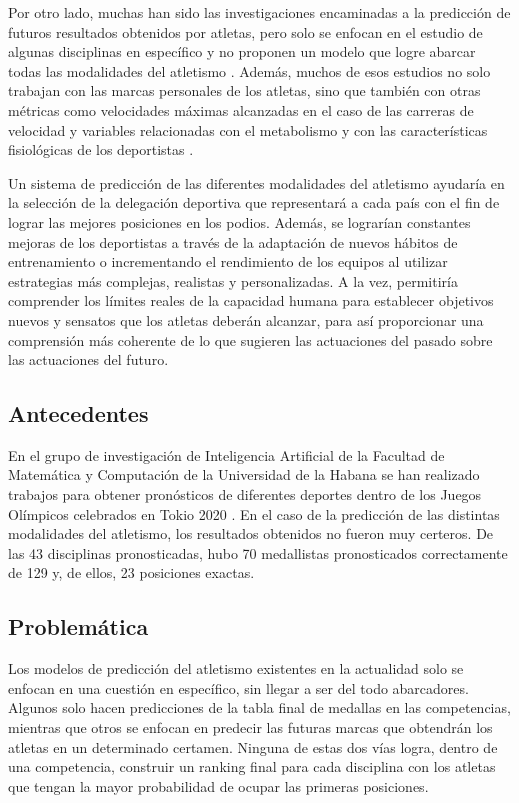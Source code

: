 Por otro lado, muchas han sido las investigaciones encaminadas a la predicción de futuros resultados obtenidos por atletas, pero solo se enfocan en el estudio de algunas disciplinas en específico y no proponen un modelo que logre abarcar todas las modalidades del atletismo \cite{girardi2022performance}. Además, muchos de esos estudios no solo trabajan con las marcas personales de los atletas, sino que también con otras métricas como velocidades máximas alcanzadas en el caso de las carreras de velocidad y variables relacionadas con el metabolismo y con las características fisiológicas de los deportistas \cite{zhou2022sports}\cite{mulligan2018minimal}.

Un sistema de predicción de las diferentes modalidades del atletismo ayudaría en la selección de la delegación deportiva que representará a cada país con el fin de lograr las mejores posiciones en los podios. Además, se lograrían constantes mejoras de los deportistas a través de la adaptación de nuevos hábitos de entrenamiento o incrementando el rendimiento de los equipos al utilizar estrategias más complejas, realistas y personalizadas.  A la vez, permitiría comprender los límites reales de la capacidad humana para establecer objetivos nuevos y sensatos que los atletas deberán alcanzar, para así proporcionar una comprensión más coherente de lo que sugieren las actuaciones del pasado sobre las actuaciones del futuro.

\subsection*{Antecedentes}

En el grupo de investigación de Inteligencia Artificial de la Facultad de Matemática y Computación de la Universidad de la Habana se han realizado trabajos para obtener pronósticos de diferentes deportes dentro de los Juegos Olímpicos celebrados en Tokio 2020 \cite{tokio2020}. En el caso de la predicción de las distintas modalidades del atletismo, los resultados obtenidos no fueron muy certeros. De las 43 disciplinas pronosticadas, hubo 70 medallistas pronosticados correctamente de 129 y, de ellos, 23 posiciones exactas.  

\subsection*{Problemática} 

Los modelos de predicción del atletismo existentes en la actualidad solo se enfocan en una cuestión en específico, sin llegar a ser del todo abarcadores. Algunos solo hacen predicciones de la tabla final de medallas en las competencias, mientras que otros se enfocan en predecir las futuras marcas que obtendrán los atletas en un determinado certamen. Ninguna de estas dos vías logra, dentro de una competencia, construir un ranking final para cada disciplina con los atletas que tengan la mayor probabilidad de ocupar las primeras posiciones.

